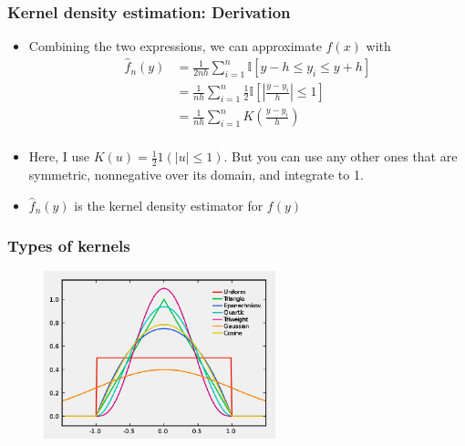 \documentclass[aspectratio=169]{beamer}
\begin{document}
\begin{frame}
\frametitle{Kernel density estimation: Derivation}
\begin{itemize}
\item Combining the two expressions, we can approximate $f(x)$ with
\begin{align*}
\hat{f}_n(y)&=\frac{1}{2nh}\sum_{i=1}^n \mathbb{I}[y-h\leq y_i \leq y+h]\\
&=\frac{1}{nh}\sum_{i=1}^n \frac{1}{2}\mathbb{I}\left[\left|\frac{y-y_i}{h}\right| \leq 1\right]\\
&=\frac{1}{nh}\sum_{i=1}^n K\left(\frac{y-y_i}{h}\right)\\
\end{align*}
\item Here, I use $K(u)=\frac{1}{2}1(|u|\leq 1)$. But you can use any other ones that are symmetric, nonnegative over its domain, and integrate to 1.
\item $\hat{f}_n(y)$ is the kernel density estimator for $f(y)$
\end{itemize}
\end{frame}

\begin{frame}
\frametitle{Types of kernels}
\begin{figure}[H]
\centering
\includegraphics[width=0.6\textwidth, keepaspectratio]{kernel.png}
\end{figure}
\end{frame}
\end{document}
